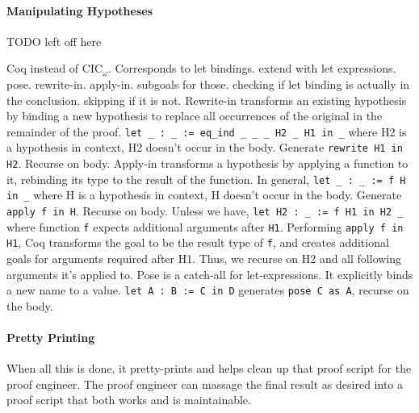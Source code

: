 \paragraph{Manipulating Hypotheses}
TODO left off here

Coq instead of CIC$_{\omega}$.
Corresponds to let bindings.
extend with let expressions. pose. rewrite-in. apply-in. subgoals for those.
checking if let binding is actually in the conclusion.
skipping if it is not.
Rewrite-in transforms an existing hypothesis by binding a new hypothesis to replace all occurrences of the original in the remainder of the proof.
\lstinline{let _ : _ := eq_ind _ _ _ H2 _ H1 in _} where
		H2 is a hypothesis in context,
		H2 doesn’t occur in the body.
		Generate \lstinline{rewrite H1 in H2}. Recurse on body.
Apply-in transforms a hypothesis by applying a function to it, rebinding its type to the result of the function.
		In general,
		\lstinline{let _ : _ := f H in _} where
		H is a hypothesis in context,
		H doesn’t occur in the body.
		Generate  \lstinline{apply f in H}. Recurse on body.
		Unless we have,
		\lstinline{let H2 : _ := f H1 in H2 _} where
function \lstinline{f} expects additional arguments after \lstinline{H1}.
Performing \lstinline{apply f in H1}, Coq transforms the goal to be the result type of \lstinline{f}, and creates additional goals for arguments required after H1. Thus, we recurse on H2 and all following arguments it’s applied to.
Pose is a catch-all for let-expressions. It explicitly binds a new name to a value.
\lstinline{let A : B := C in D} generates \lstinline{pose C as A}, recurse on the body.

\paragraph{Pretty Printing}
When all this is done, it pretty-prints and helps clean up that proof script for the proof engineer.
The proof engineer can massage the final result as desired into a proof script that both works and is maintainable.





